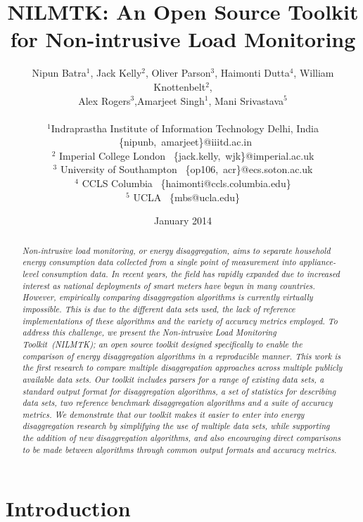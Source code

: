 \documentclass{sig-alternate}
\title{NILMTK: An Open Source Toolkit for Non-intrusive Load Monitoring}
\author{Nipun Batra$^1$, Jack Kelly$^2$, Oliver Parson$^3$, Haimonti Dutta$^4$, William Knottenbelt$^2$,\\ Alex Rogers$^3$,Amarjeet Singh$^1$, Mani Srivastava$^5$\\ \\
\small$^1$Indraprastha Institute of Information Technology Delhi, India ~\{nipunb,~amarjeet\}@iiitd.ac.in\\
\small$^2$ Imperial College London ~\{jack.kelly,~wjk\}@imperial.ac.uk\\
\small$^3$ University of Southampton ~\{op106,~acr\}@ecs.soton.ac.uk\\
\small$^4$ CCLS Columbia ~\{haimonti@ccls.columbia.edu\}\\
\small$^5$ UCLA ~\{mbs@ucla.edu\}\\
}
\date{January 2014}
\newcommand\Mark[1]{\textsuperscript#1}
\begin{document}
\maketitle



\begin{abstract}
\noindent
\textit{
Non-intrusive load monitoring, or energy disaggregation, aims to separate household energy consumption data collected from a single point of measurement into appliance-level consumption data. In recent years, the field has rapidly expanded due to increased interest as national deployments of smart meters have begun in many countries. However, empirically comparing disaggregation algorithms is currently virtually impossible. This is due to the different data sets used, the lack of reference implementations of these algorithms and the variety of accuracy metrics employed. To address this challenge, we present the Non-intrusive Load Monitoring Toolkit~(NILMTK); an open source toolkit designed specifically to enable the comparison of energy disaggregation algorithms in a reproducible manner. This work is the first research to compare multiple disaggregation approaches across multiple publicly available data sets. Our toolkit includes parsers for a range of existing data sets, a standard output format for disaggregation algorithms, a set of statistics for describing data sets, two reference benchmark disaggregation algorithms and a suite of accuracy metrics. We demonstrate that our toolkit makes it easier to enter into energy disaggregation research by simplifying the use of multiple data sets, while supporting the addition of new disaggregation algorithms, and also encouraging direct comparisons to be made between algorithms through common output formats and accuracy metrics. }
\end{abstract}

\section{Introduction}
\end{document}
